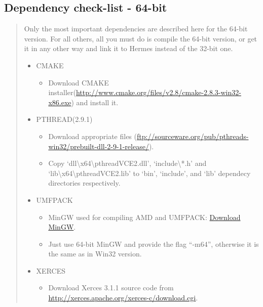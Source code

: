 \documentclass[a4paper,0pt,english]{sphinxmanual}
\begin{document}
\subsection{Dependency check-list - 64-bit}
\label{src/installation/win:dependency-check-list-64-bit}\begin{quote}

Only the most important dependencies are described here for the 64-bit version. For all others, all you must do is compile the 64-bit version, or get it in any other way and link it to Hermes instead of the 32-bit one.
\begin{itemize}
\item {} 
CMAKE
\begin{itemize}
\item {} 
Download CMAKE installer(\href{http://www.cmake.org/files/v2.8/cmake-2.8.3-win32-x86.exe}{http://www.cmake.org/files/v2.8/cmake-2.8.3-win32-x86.exe}) and install it.

\end{itemize}

\item {} 
PTHREAD(2.9.1)
\begin{itemize}
\item {} 
Download appropriate files (\href{ftp://sourceware.org/pub/pthreads-win32/prebuilt-dll-2-9-1-release/}{ftp://sourceware.org/pub/pthreads-win32/prebuilt-dll-2-9-1-release/}).

\item {} 
Copy `dll\textbackslash{}x64\textbackslash{}pthreadVCE2.dll', `include\textbackslash{}*.h' and `lib\textbackslash{}x64\textbackslash{}pthreadVCE2.lib' to `bin', `include', and `lib' dependecy directories respectively.

\end{itemize}

\item {} 
UMFPACK
\begin{itemize}
\item {} 
MinGW used for compiling AMD and UMFPACK: \href{http://sourceforge.net/projects/mingw/}{Download MinGW}.

\item {} 
Just use 64-bit MinGW and provide the flag ``-m64'', otherwise it is the same as in Win32 version.

\end{itemize}

\item {} 
XERCES
\begin{itemize}
\item {} 
Download Xerces 3.1.1 source code from \href{http://xerces.apache.org/xerces-c/download.cgi}{http://xerces.apache.org/xerces-c/download.cgi}.


\end{itemize}
\end{itemize}
\end{quote}
\end{document}
